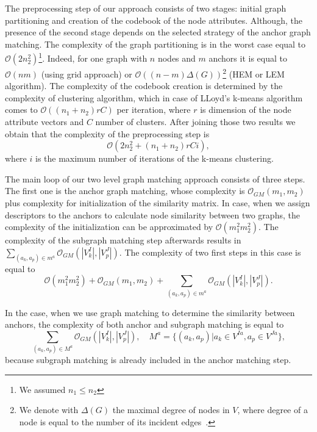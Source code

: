 The preprocessing step of our approach consists of two stages: initial graph partitioning and creation of the codebook of the node attributes. Although, the presence of the second stage depends on the selected strategy of the anchor graph matching. The complexity of the graph partitioning is in the worst case equal to $\mathcal{O}(2n_2^2)$\footnote{We assumed $n_1\le n_2$}. Indeed, for one graph with $n$ nodes and $m$ anchors it is equal to $\mathcal{O}(nm)$ (using grid approach) or $\mathcal{O}((n-m)\Delta(G))$\footnote{We denote with $\Delta(G)$ the maximal degree of nodes in $V$, where degree of a node is equal to the number of its incident edges~\cite{Diestel2000}.} (HEM or LEM algorithm). The complexity of the codebook creation is determined by the complexity of clustering algorithm, which in case of LLoyd's k-means algorithm comes to $\mathcal{O}((n_1+n_2)rC)$ per iteration, where $r$ is dimension of the node attribute vectors and $C$ number of clusters. After joining those two results we obtain that the complexity of the preprocessing step is
\begin{equation}\label{eq:complexity1}
\mathcal{O}(2n_2^2+(n_1+n_2)rCi),
\end{equation}where $i$ is the maximum number of iterations of the k-means clustering.

The main loop of our two level graph matching approach consists of three steps. The first one is the anchor graph matching, whose complexity is $\mathcal{O}_{GM}(m_1,m_2)$ plus complexity for initialization of the similarity matrix. In case, when we assign descriptors to the anchors to calculate node similarity between two graphs, the complexity of the initialization can be approximated by $\mathcal{O}(m_1^2m_2^2)$. The complexity of the subgraph matching step afterwards results in $\sum_{(a_k,a_p)\in m^a}\mathcal{O}_{GM}(|V^I_k|,|V^J_p|)$. The complexity of two first steps in this case is equal to
\begin{equation}\label{eq:complexity2}
\mathcal{O}(m_1^2m_2^2)+\mathcal{O}_{GM}(m_1,m_2)+\sum_{(a_k,a_p)\in m^a}\mathcal{O}_{GM}(|V^I_k|,|V^J_p|).
\end{equation}


In the case, when we use graph matching to determine the similarity between anchors, the complexity of both anchor and subgraph matching is equal to 
\begin{equation}
\sum_{(a_k,a_p)\in M^a}\mathcal{O}_{GM}(|V^I_k|,|V^J_p|),\quad M^a=\{(a_k,a_p)|a_k\in V^{Ia},a_p\in V^{Ja}\},
\end{equation}because subgraph matching is already included in the anchor matching step.

